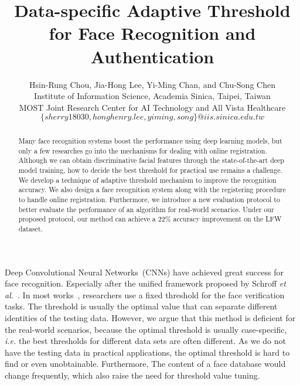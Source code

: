 \documentclass[10pt,twocolumn]{article}
\begin{document}
\title{Data-specific Adaptive Threshold for Face Recognition and Authentication}
       
\author{Hsin-Rung Chou, Jia-Hong Lee, Yi-Ming Chan, and Chu-Song Chen\\
Institute of Information Science, Academia Sinica, Taipei, Taiwan\\
MOST Joint Research Center for AI Technology and All Vista Healthcare\\
$\{sherry18030, honghenry.lee, yiming, song\}@iis.sinica.edu.tw$
}

\maketitle
\thispagestyle{empty}

\begin{abstract}
Many face recognition systems boost the performance using deep learning models, but only a few researches go into the mechanisms for dealing with online registration. Although we can obtain discriminative facial features through the state-of-the-art deep model training, how to decide the best threshold for practical use remains a challenge. We develop a technique of adaptive threshold mechanism to improve the recognition accuracy. We also design a face recognition system along with the registering procedure to handle online registration. Furthermore, we introduce a new evaluation protocol to better evaluate the performance of an algorithm for real-world scenarios. Under our proposed protocol, our method can achieve a 22\% accuracy improvement on the LFW dataset.
\end{abstract}

Deep Convolutional Neural Networks~(CNNs) have achieved great success for face recognition. Especially after the unified framework proposed by Schroff \textit{et al.}~\cite{schroff2015facenet}.
In most works~\cite{chen2018mobilefacenets,parkhi2015deep,schroff2015facenet}, researchers use a fixed threshold for the face verification tasks. The threshold is usually the optimal value that can separate different identities of the testing data. However, we argue that this method is deficient for the real-world scenarios, because the optimal threshold is usually case-specific, \textit{i.e.} the best thresholds for different data sets are often different. As we do not have the testing data in practical applications, the optimal threshold is hard to find or even unobtainable. Furthermore, The content of a face database would change frequently, which also raise the need for threshold value tuning.
\end{document}
